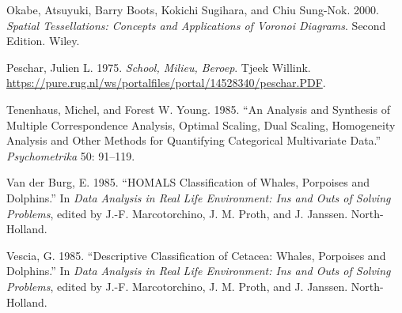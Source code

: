 \documentclass[
  12pt,
  letterpaper,
  DIV=11,
  numbers=noendperiod]{scrartcl}
\newlength{\cslhangindent}
\newenvironment{CSLReferences}[2] %
 {\begin{list}{}{%
  \setlength{\itemindent}{0pt}
  \setlength{\leftmargin}{0pt}
  \setlength{\parsep}{0pt}
  \ifodd #1
   \setlength{\leftmargin}{\cslhangindent}
   \setlength{\itemindent}{-1\cslhangindent}
  \fi
  \setlength{\itemsep}{#2\baselineskip}}}
 {\end{list}}
\begin{document}
\begin{CSLReferences}{1}{1}
Okabe, Atsuyuki, Barry Boots, Kokichi Sugihara, and Chiu Sung-Nok. 2000.
\emph{Spatial Tessellations: Concepts and Applications of Voronoi
Diagrams}. Second Edition. Wiley.

Peschar, Julien L. 1975. \emph{{School, Milieu, Beroep}}. Tjeek Willink.
\url{https://pure.rug.nl/ws/portalfiles/portal/14528340/peschar.PDF}.

Tenenhaus, Michel, and Forest W. Young. 1985. {``{An Analysis and
Synthesis of Multiple Correspondence Analysis, Optimal Scaling, Dual
Scaling, Homogeneity Analysis and Other Methods for Quantifying
Categorical Multivariate Data}.''} \emph{Psychometrika} 50: 91--119.

Van der Burg, E. 1985. {``HOMALS Classification of Whales, Porpoises and
Dolphins.''} In \emph{Data Analysis in Real Life Environment: Ins and
Outs of Solving Problems}, edited by J.-F. Marcotorchino, J. M. Proth,
and J. Janssen. North-Holland.

Vescia, G. 1985. {``Descriptive Classification of Cetacea: Whales,
Porpoises and Dolphins.''} In \emph{Data Analysis in Real Life
Environment: Ins and Outs of Solving Problems}, edited by J.-F.
Marcotorchino, J. M. Proth, and J. Janssen. North-Holland.

\end{CSLReferences}
\end{document}
